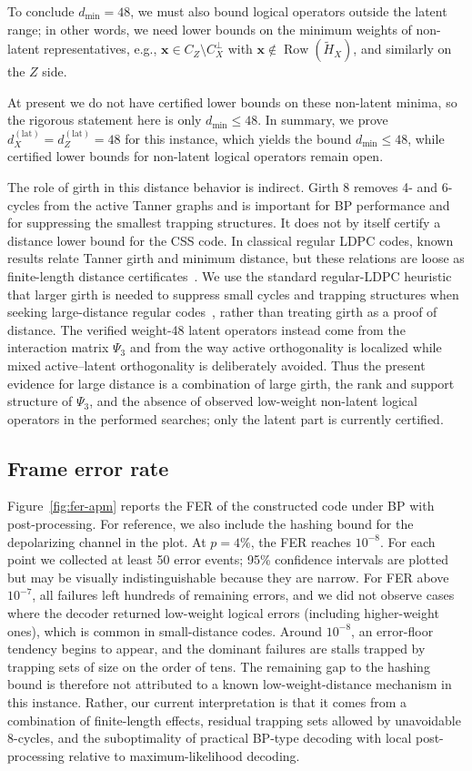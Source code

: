 \documentclass[a4paper,onecolumn,11pt,accepted=2026-08-03]{quantumarticle}
\newcommand{\Hres}{\tilde{H}}
\DeclareMathOperator{\Row}{Row}
\renewcommand\[{\begin{equation}}
\renewcommand\]{\end{equation}}
\theoremstyle{definition}
\begin{document}
To conclude $d_{\min}=48$, we must also bound logical operators outside the latent range; in other words,
  we need lower bounds on the minimum weights of non-latent representatives, e.g., $\boldsymbol{x}\in C_Z\setminus C_X^\perp$ with $\boldsymbol{x}\notin\Row(\Hres_X)$, and similarly on the $Z$ side.

At present we do not have certified lower bounds on these non-latent minima, so the rigorous statement here is only $d_{\min}\le 48$. In summary, we prove $d_X^{(\mathrm{lat})}=d_Z^{(\mathrm{lat})}=48$ for this instance, which yields the bound $d_{\min}\le 48$, while certified lower bounds for non-latent logical operators remain open.

 {The role of girth in this distance behavior is indirect.
Girth 8 removes 4- and 6-cycles from the active Tanner graphs and is important for BP performance and for suppressing the smallest trapping structures.
It does not by itself certify a distance lower bound for the CSS code.
In classical regular LDPC codes, known results relate Tanner girth and minimum distance, but these relations are loose as finite-length distance certificates~\cite{Tanner2001}.
We use the standard regular-LDPC heuristic that larger girth is needed to suppress small cycles and trapping structures when seeking large-distance regular codes~\cite{Tanner1981,Richardson2003ErrorFloors}, rather than treating girth as a proof of distance.
The verified weight-48 latent operators instead come from the interaction matrix $\Psi_3$ and from the way active orthogonality is localized while mixed active--latent orthogonality is deliberately avoided.
Thus the present evidence for large distance is a combination of large girth, the rank and support structure of $\Psi_3$, and the absence of observed low-weight non-latent logical operators in the performed searches; only the latent part is currently certified.}


 \subsection{Frame error rate}
Figure~\ref{fig:fer-apm} reports the FER of the constructed code under BP with post-processing. For reference, we also include the hashing bound for the depolarizing channel in the plot. At $p=4\%$, the FER reaches $10^{-8}$. For each point we collected at least 50 error events; 95\% confidence intervals are plotted but may be visually indistinguishable because they are narrow. For FER above $10^{-7}$, all failures left hundreds of remaining errors, and we did not observe cases where the decoder returned low-weight logical errors (including higher-weight ones), which is common in small-distance codes. Around $10^{-8}$, an error-floor tendency begins to appear, and the dominant failures are stalls trapped by trapping sets of size on the order of tens.
 {The remaining gap to the hashing bound is therefore not attributed to a known low-weight-distance mechanism in this instance.
Rather, our current interpretation is that it comes from a combination of finite-length effects, residual trapping sets allowed by unavoidable 8-cycles, and the suboptimality of practical BP-type decoding with local post-processing relative to maximum-likelihood decoding.
}
 
\end{document}
